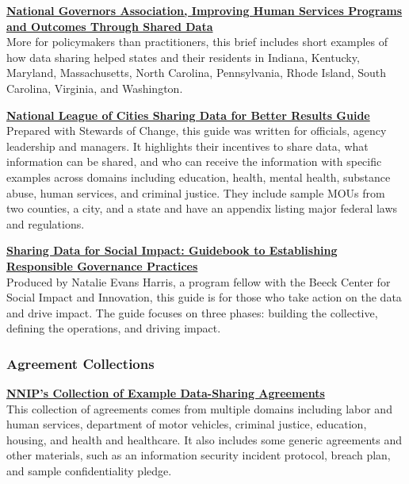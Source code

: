 \documentclass[
]{book}
\begin{document}
\textbf{\href{http://natlgovassoc.wpengine.com/wp-content/uploads/2018/07/1609ImprovingHumanServicesSharedData.pdf}{National Governors Association, Improving Human Services Programs and Outcomes Through Shared Data}}\\
More for policymakers than practitioners, this brief includes short examples of how data sharing helped states and their residents in Indiana, Kentucky, Maryland, Massachusetts, North Carolina, Pennsylvania, Rhode Island, South Carolina, Virginia, and Washington.

\textbf{\href{https://www.nlc.org/sharing-data-for-better-results}{National League of Cities Sharing Data for Better Results Guide}}\\
Prepared with Stewards of Change, this guide was written for officials, agency leadership and managers. It highlights their incentives to share data, what information can be shared, and who can receive the information with specific examples across domains including education, health, mental health, substance abuse, human services, and criminal justice. They include sample MOUs from two counties, a city, and a state and have an appendix listing major federal laws and regulations.

\textbf{\href{https://beeckcenter.georgetown.edu/wp-content/uploads/2020/01/Data-Sharing-Report.pdf}{Sharing Data for Social Impact: Guidebook to Establishing Responsible Governance Practices}}\\
Produced by Natalie Evans Harris, a program fellow with the Beeck Center for Social Impact and Innovation, this guide is for those who take action on the data and drive impact. The guide focuses on three phases: building the collective, defining the operations, and driving impact.

\hypertarget{agreement-collections}{%
\subsubsection*{Agreement Collections}\label{agreement-collections}}

\textbf{\href{https://www.neighborhoodindicators.org/library/guides/nnip\%E2\%80\%99s-collection-example-data-sharing-agreements}{NNIP's Collection of Example Data-Sharing Agreements}}\\
This collection of agreements comes from multiple domains including labor and human services, department of motor vehicles, criminal justice, education, housing, and health and healthcare. It also includes some generic agreements and other materials, such as an information security incident protocol, breach plan, and sample confidentiality pledge.
\end{document}
